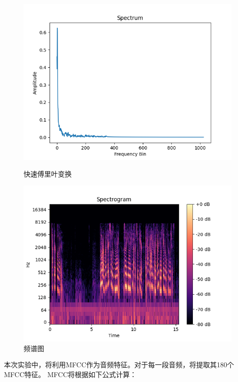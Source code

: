 \documentclass{article}
\begin{document}
\begin{figure}[H]
    \begin{minipage}[H]{0.5\linewidth}
        \centering
        \includegraphics[width=\textwidth]{figures/fft.png}
        \caption{快速傅里叶变换}
        \label{fft}
    \end{minipage}
    \begin{minipage}[H]{0.5\linewidth}
        \centering
        \includegraphics[width=\textwidth]{figures/spectrogram.png}
        \caption{频谱图}
        \label{spec}
    \end{minipage}
\end{figure}

本次实验中，将利用MFCC作为音频特征。对于每一段音频，将提取其180个MFCC特征。
MFCC将根据如下公式计算：
\end{document}
